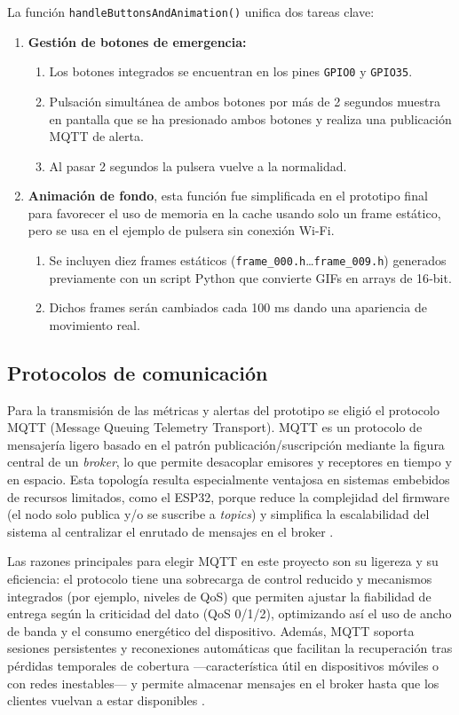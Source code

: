 \documentclass[12pt, a4paper]{article}
\begin{document}
	La función \texttt{handleButtonsAndAnimation()} unifica dos tareas clave:
	\begin{enumerate}
		\item \textbf{Gestión de botones de emergencia:}
		\begin{enumerate}
			\item Los botones integrados se encuentran en los pines \texttt{GPIO0} y \texttt{GPIO35}. 
			\item Pulsación simultánea de ambos botones por más de 2 segundos muestra en pantalla  que se ha presionado ambos botones y realiza una publicación MQTT de alerta.  
			\item Al pasar 2 segundos la pulsera vuelve a la normalidad.
		\end{enumerate}
		\item \textbf{Animación de fondo}, esta función fue simplificada en el prototipo final para favorecer el uso de memoria en la cache usando solo un frame estático, pero se usa en el ejemplo de pulsera sin conexión Wi-Fi.  
		\begin{enumerate}
			\item Se incluyen diez frames estáticos (\texttt{frame\_000.h}…\texttt{frame\_009.h}) generados previamente con un script Python que convierte GIFs en arrays de 16‑bit.  
			\item Dichos frames serán cambiados cada 100 ms dando una apariencia de movimiento real.
		\end{enumerate}
	\end{enumerate}
	
	\subsection{Protocolos de comunicación}
	
	Para la transmisión de las métricas y alertas del prototipo se eligió el protocolo MQTT (Message Queuing Telemetry Transport). MQTT es un protocolo de mensajería ligero basado en el patrón publicación/suscripción mediante la figura central de un \emph{broker}, lo que permite desacoplar emisores y receptores en tiempo y en espacio. Esta topología resulta especialmente ventajosa en sistemas embebidos de recursos limitados, como el ESP32, porque reduce la complejidad del firmware (el nodo solo publica y/o se suscribe a \emph{topics}) y simplifica la escalabilidad del sistema al centralizar el enrutado de mensajes en el broker \cite{mosquitto,aws_mqtt}.
	
	Las razones principales para elegir MQTT en este proyecto son su ligereza y su eficiencia: el protocolo tiene una sobrecarga de control reducido y mecanismos integrados (por ejemplo, niveles de QoS) que permiten ajustar la fiabilidad de entrega según la criticidad del dato (QoS 0/1/2), optimizando así el uso de ancho de banda y el consumo energético del dispositivo. Además, MQTT soporta sesiones persistentes y reconexiones automáticas que facilitan la recuperación tras pérdidas temporales de cobertura —característica útil en dispositivos móviles o con redes inestables— y permite almacenar mensajes en el broker hasta que los clientes vuelvan a estar disponibles \cite{seoane2021,aws_mqtt}.
	
\end{document}
